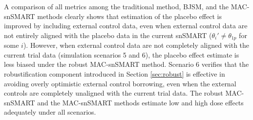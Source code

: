 A comparison of all metrics among the traditional method, \ac{BJSM}, and the MAC-snSMART methods clearly shows that estimation of the placebo effect is improved by including external control data, even when external control data are not entirely aligned with the placebo data in the current \ac{snSMART} ($\theta_{i}' \ne \theta_{1p}$ for some $i$). However, when external control data are not completely aligned with the current trial data (simulation scenarios 5 and 6), the placebo effect estimate is less biased under the robust MAC-snSMART method. Scenario 6 verifies that the robustification component introduced in Section \ref{sec:robust} is effective in avoiding overly optimistic external control borrowing, even when the external controls are completely unaligned with the current trial data. The robust MAC-snSMART and the MAC-snSMART methods estimate low and high dose effects adequately under all scenarios.

